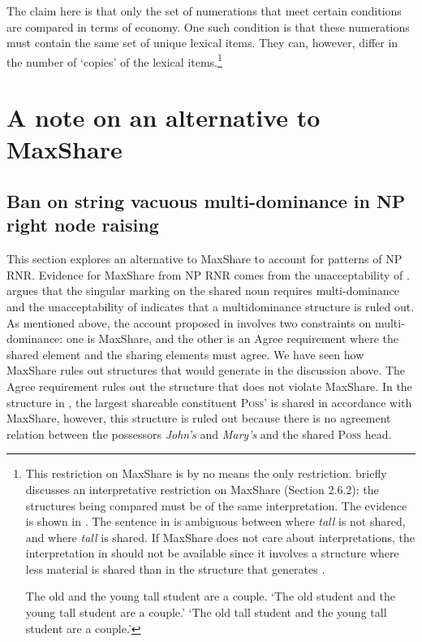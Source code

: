 \documentclass[output=paper]{langscibook}
\begin{document}
The claim here is that only the set of numerations that meet certain conditions are compared in terms of economy. One such condition is that these numerations must contain the same set of unique lexical items. They can, however, differ in the number of `copies' of the lexical items.\footnote{This restriction on MaxShare is by no means the only restriction. \citet{Shen:2018a} briefly discusses an interpretative restriction on MaxShare (Section 2.6.2):  the structures being compared must be of the same interpretation. The evidence is shown in . The sentence in  is ambiguous between  where \textit{tall} is not shared, and  where \textit{tall} is shared. If MaxShare does not care about interpretations, the interpretation in  should not be available since it involves a structure where less material is shared than in the structure that generates .

\ea 
	\label{shenftn8exi}
	The old and the young tall student are a couple.
	\ea 
		\label{shenftn8exi:a}
		`The old student and the young tall student are a couple.'
	\ex 
		\label{shenftn8exi:b}
		`The old tall student and the young tall student are a couple.'
	\z 
\z 
}


\section{A note on an alternative to MaxShare}
\label{shensect:alternatives}

\subsection{Ban on string vacuous multi-dominance in NP right node raising}
\label{shensect:ban}

This section explores an alternative to MaxShare to account for patterns of NP RNR. Evidence for MaxShare from NP RNR comes from the unacceptability of . \citet{Shen:2018a} argues that the singular marking on the shared noun requires multi-dominance and the unacceptability of  indicates that a multidominance structure is ruled out. As mentioned above, the account proposed in \citet{Shen:2018a} involves two constraints on multi-dominance: one is MaxShare, and the other is an Agree requirement where the shared element and the sharing elements must agree. We have seen how MaxShare rules out structures that would generate  in the discussion above. The Agree requirement rules out the structure that does not violate MaxShare. In the structure in , the largest shareable constituent \textsc{Poss'} is shared in accordance with MaxShare, however, this structure is ruled out because there is no agreement relation between the possessors \textit{John's} and \textit{Mary's} and the shared \textsc{Poss} head.
\end{document}
